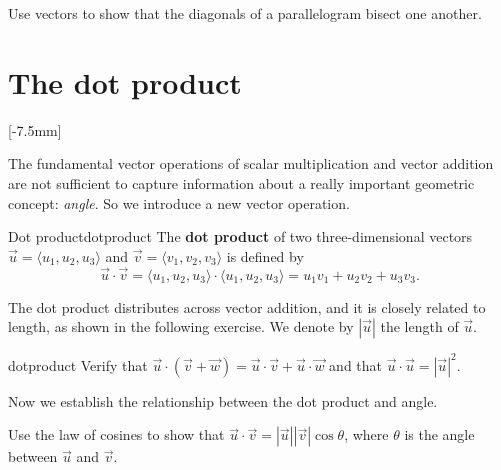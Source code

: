 \documentclass[svgnames]{watsonbook}
\begin{document}
\begin{exercise}{}{}
  Use vectors to show that the diagonals of a parallelogram bisect one
  another. 
\end{exercise}

\section{The dot product} \label{sec:dot} 

[-7.5mm]

The fundamental vector operations of scalar multiplication and vector
addition are not sufficient to capture information about a really important
geometric concept: \textit{angle}. So we introduce a new vector
operation.

\begin{defn}{Dot product}{dotproduct}
The \textbf{dot product} of two three-dimensional vectors $\vec{u}
= \langle u_1, u_2, u_3 \rangle$
and $\vec{v} =  \langle v_1, v_2, v_3 \rangle$ is defined by 
\[
\vec{u} \cdot \vec{v} = \langle u_1, u_2, u_3 \rangle \cdot \langle u_1, u_2, u_3 \rangle =
u_1 v_1 + u_2  v_2+ u_3v_3. 
\]
\end{defn}

The dot product distributes across vector addition, and it is closely
related to length, as shown in the following exercise. We denote by
$|\vec{u}|$ the length of $\vec{u}$. 

\begin{exercise}{}{dotproduct}
  Verify that $\vec{u} \cdot (\vec{v} + \vec{w}) = \vec{u} \cdot
  \vec{v} + \vec{u} \cdot \vec{w}$ and that $\vec{u} \cdot
  \vec{u} = |\vec{u}|^2$.
\end{exercise}

Now we establish the relationship between the dot product and angle. 

\begin{example}{}{}
  Use the law of cosines to show that $\vec{u} \cdot \vec{v} =
  |\vec{u}| |\vec{v}| \cos\theta$, where $\theta$ is the angle
  between $\vec{u}$ and $\vec{v}$. 
\end{example}
\end{document}
